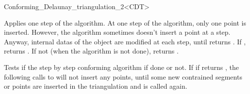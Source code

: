 \begin{ccRefClass}{Conforming_Delaunay_triangulation_2<CDT>}
\begin{ccAdvanced}
{ Applies one step of the algorithm. At one step of the algorithm,
  only one point is inserted. However, the algorithm sometimes doesn't
  insert a point at a step. Anyway, internal datas of the \ccRefName{}
  object are modified at each step, until 
  returns . If , returns
  . If not (when the algorithm is not done), returns
  .}

\ccGlue
{}

{ Tests if the step by step conforming algorithm if done or not. If if
  returns , the following calls to
   will not insert any points, until some
  new contrained segments or points are inserted in the triangulation and
   is called again. }

\end{ccAdvanced}

\end{ccRefClass}

